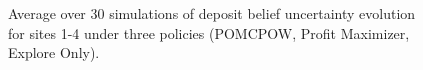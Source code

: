 \begin{figure}[H]

\caption{Average over 30 simulations of deposit belief uncertainty evolution for sites 1-4 under three policies (POMCPOW, Profit Maximizer, Explore Only).}
\label{fig:deposit_uncertainty_grid}
\end{figure}
